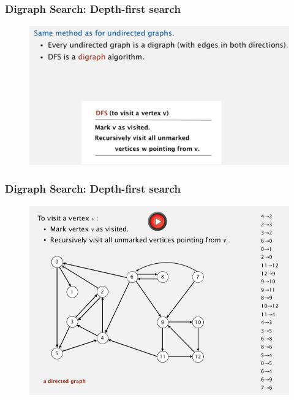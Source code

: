 \documentclass[11pt]{beamer}
\begin{document}
 \begin{frame}
	\frametitle	{Digraph Search: Depth-first search} 
   	\begin{figure}
   		\centering
   		\includegraphics[width=1\linewidth]{"Screenshot 2020-12-03 at 6.53.19 AM"}
   		\label{fig:screenshot-2020-12-03-at-6}
   	\end{figure}  	
\end{frame}

 \begin{frame}
	\frametitle	{Digraph Search: Depth-first search} 
    	\begin{figure}
    		\centering
    		\includegraphics[width=0.9\linewidth]{"Screenshot 2020-12-03 at 7.11.04 AM"}
    		\label{fig:screenshot-2020-12-03-at-7}
    	\end{figure}
    	
\end{frame}
\end{document}
